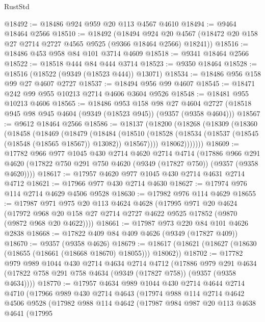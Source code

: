 \begin{lexlean}{RustStd}
\begin{coremodule}
{\begin{coremodule}
{{{{{{{{{{{{{{{{{{{{{{{{{{{{{{{{{{{{{{{@18492 := @18486 @924 @959 @20 @113 @4567 @4610
@18494 := @9464 @18464 @2566
@18510 := @18492
    (@18494
      @924
      @20
      @4567
      (@18472 @20 @158 @27 @2714 @2727 @4565 @9525 (@9366 @18464 @2566) @18241))
@18516 := @18486 @453 @958 @84 @101 @3714 @4609
@18518 := @9341 @18464 @2566
@18522 := @18518 @444 @84 @444 @3714
@18523 := @9350 @18464
@18528 := @18516 (@18522 (@9349 (@18523 @444)) @13071)
@18534 := @18486 @956 @158 @99 @27 @4607 @2727
@18537 := @18494 @956 @99 @4607
@18545 := @18471 @242 @99 @955 @10213 @2714 @4606 @3604 @9526
@18548 := @18481 @955 @10213 @4606
@18565 := @18486
    @953
    @158
    @98
    @27
    @4604
    @2727
    (@18518 @945 @98 @945 @4604 (@9349 (@18523 @945)) (@9357 (@9358 @4604)))
@18567 := @9612 @18464 @2566
@18586 := @18137
    (@18200
      (@18268
        (@18309
          (@18360
            (@18458
              (@18469
                (@18479
                  (@18484
                    (@18510
                      (@18528 (@18534 (@18537 (@18545 (@18548 (@18565 @18567)) @13082)) @18567))))
                  @18062)))))))
@18609 := @17782
    @966
    @977
    @1045
    @430
    @2714
    @4620
    @2714
    @4714
    (@17886
      @966
      @291
      @4620
      (@17822 @750 @291 @750 @4620 (@9349 (@17827 @750)) (@9357 (@9358 @4620))))
@18617 := @17957 @4620 @977 @1045 @430 @2714 @4631 @2714 @4712
@18621 := @17966 @977 @430 @2714 @4630
@18627 := @17974 @976 @114 @2714 @4629 @4506 @9528
@18630 := @17982 @976 @114 @4629
@18655 := @17987
    @971
    @975
    @20
    @113
    @4624
    @4628
    (@17995
      @971
      @20
      @4624
      (@17972 @968 @20 @158 @27 @2714 @2727 @4622 @9525 @17852 (@9870 (@9872 @968 @20 @4622))))
@18661 := @17987 @973 @220 @84 @101 @4626 @2838
@18668 := @17822 @409 @84 @409 @4626 (@9349 (@17827 @409))
@18670 := @9357 (@9358 @4626)
@18679 := @18617 (@18621 (@18627 (@18630 (@18655 (@18661 (@18668 @18670) @18055))) @18062))
@18702 := @17782
    @979
    @989
    @1044
    @430
    @2714
    @4634
    @2714
    @4712
    (@17886
      @979
      @291
      @4634
      (@17822 @758 @291 @758 @4634 (@9349 (@17827 @758)) (@9357 (@9358 @4634))))
@18770 := @17957
    @4634
    @989
    @1044
    @430
    @2714
    @4644
    @2714
    @4710
    (@17966
      @989
      @430
      @2714
      @4643
      (@17974
        @988
        @114
        @2714
        @4642
        @4506
        @9528
        (@17982
          @988
          @114
          @4642
          (@17987
            @984
            @987
            @20
            @113
            @4638
            @4641
            (@17995
}}}}}}}}}}}}}}}}}}}}}}}}}}}}}}}}}}}}}}}
\end{coremodule}}
\end{coremodule}
\end{lexlean}
